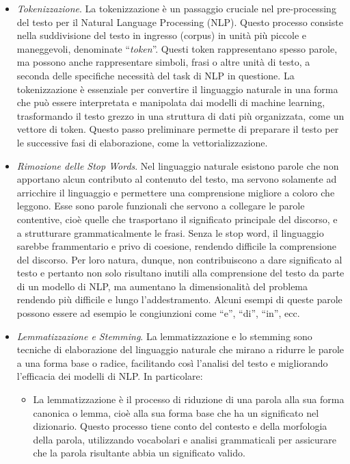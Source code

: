 \documentclass[12pt,a4paper,twoside,openright]{book}
\begin{document}
\begin{itemize}
    \item \emph{Tokenizzazione}. La tokenizzazione è un passaggio cruciale nel pre-processing del testo per il Natural Language Processing (NLP). Questo processo consiste nella suddivisione del testo in ingresso (corpus) in unità più piccole e maneggevoli, denominate ``\emph{token}''. Questi token rappresentano spesso parole, ma possono anche rappresentare simboli, frasi o altre unità di testo, a seconda delle specifiche necessità del task di NLP in questione. La tokenizzazione è essenziale per convertire il linguaggio naturale in una forma che può essere interpretata e manipolata dai modelli di machine learning, trasformando il testo grezzo in una struttura di dati più organizzata, come un vettore di token. Questo passo preliminare permette di preparare il testo per le successive fasi di elaborazione, come la vettorializzazione. 
    \item \emph{Rimozione delle Stop Words}. Nel linguaggio naturale esistono parole che non apportano alcun contributo al contenuto del testo, ma servono solamente ad arricchire il linguaggio e permettere una comprensione migliore a coloro che leggono. Esse sono parole funzionali che servono a collegare le parole contentive, cioè quelle che trasportano il significato principale del discorso, e a strutturare grammaticalmente le frasi. Senza le stop word, il linguaggio sarebbe frammentario e privo di coesione, rendendo difficile la comprensione del discorso. Per loro natura, dunque, non contribuiscono a dare significato al testo e pertanto non solo risultano inutili alla comprensione del testo da parte di un modello di NLP, ma aumentano la dimensionalità del problema rendendo più difficile e lungo l'addestramento. Alcuni esempi di queste parole possono essere ad esempio le congiunzioni come ``e'', ``di'', ``in'', ecc.  
    \item \emph{Lemmatizzazione e Stemming}. La lemmatizzazione e lo stemming sono tecniche di elaborazione del linguaggio naturale che mirano a ridurre le parole a una forma base o radice, facilitando così l'analisi del testo e migliorando l'efficacia dei modelli di NLP. In particolare: 
    \begin{itemize}
        \item La lemmatizzazione è il processo di riduzione di una parola alla sua forma canonica o lemma, cioè alla sua forma base che ha un significato nel dizionario. Questo processo tiene conto del contesto e della morfologia della parola, utilizzando vocabolari e analisi grammaticali per assicurare che la parola risultante abbia un significato valido. 

\end{itemize}
\end{itemize}
\end{document}
